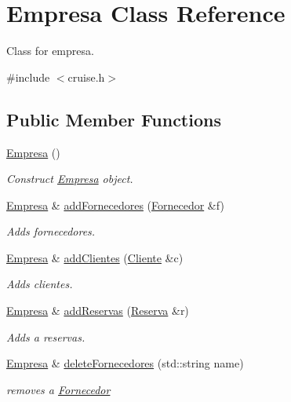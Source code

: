 \hypertarget{classEmpresa}{}\section{Empresa Class Reference}
\label{classEmpresa}


Class for empresa.  




{\ttfamily \#include $<$cruise.\+h$>$}

\subsection*{Public Member Functions}
\begin{DoxyCompactItemize}
\item 
\hyperlink{classEmpresa_aff124b958356c479ab50ddf4cf302193}{Empresa} ()
\begin{DoxyCompactList}\small\item\em Construct \hyperlink{classEmpresa}{Empresa} object. \end{DoxyCompactList}\item 
\hyperlink{classEmpresa}{Empresa} \& \hyperlink{classEmpresa_a0c858479d6e92094adbb2fc085039376}{add\+Fornecedores} (\hyperlink{classFornecedor}{Fornecedor} \&f)
\begin{DoxyCompactList}\small\item\em Adds fornecedores. \end{DoxyCompactList}\item 
\hyperlink{classEmpresa}{Empresa} \& \hyperlink{classEmpresa_a57597ec4154f274686bc648ccf5d2a59}{add\+Clientes} (\hyperlink{classCliente}{Cliente} \&c)
\begin{DoxyCompactList}\small\item\em Adds clientes. \end{DoxyCompactList}\item 
\hyperlink{classEmpresa}{Empresa} \& \hyperlink{classEmpresa_a42a1671b234ab8380cfb2ed33517edb2}{add\+Reservas} (\hyperlink{classReserva}{Reserva} \&r)
\begin{DoxyCompactList}\small\item\em Adds a reservas. \end{DoxyCompactList}\item 
\hyperlink{classEmpresa}{Empresa} \& \hyperlink{classEmpresa_ab8b7dda77caceec58e464c16b7e45f7c}{delete\+Fornecedores} (std\+::string name)
\begin{DoxyCompactList}\small\item\em removes a \hyperlink{classFornecedor}{Fornecedor} \end{DoxyCompactList}\item 

\end{DoxyCompactItemize}
